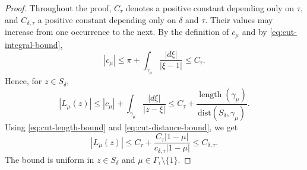 \documentclass[11pt]{amsart}
\numberwithin{equation}{section}
\theoremstyle{definition}
\theoremstyle{plain}
\def\dist{\mathrm{dist}}
\begin{document}
\begin{proof}
Throughout the proof, $C_\tau$ denotes a positive constant depending
only on $\tau$, and $C_{\delta,\tau}$ a positive constant depending
only on $\delta$ and $\tau.$ Their values may increase from one
occurrence to the next.
By the definition of \(c_\mu\) and by \eqref{eq:cut-integral-bound},
\[
        |c_\mu|
        \le
        \pi+
        \int_{\gamma_\mu}\frac{|d\xi|}{|\xi-1|}
        \le C_\tau .
\]
Hence, for \(z\in S_\delta\),
\[
        |L_\mu(z)|
        \le
        |c_\mu|+
        \int_{\gamma_\mu}\frac{|d\xi|}{|z-\xi|}
        \le
        C_\tau+
        \frac{\operatorname{length}(\gamma_\mu)}
             {\dist(S_\delta,\gamma_\mu)} .
\]
Using \eqref{eq:cut-length-bound} and \eqref{eq:cut-distance-bound}, we get
\[
        |L_\mu(z)|
        \le
        C_\tau+
        \frac{C_\tau |1-\mu|}
             {c_{\delta,\tau}|1-\mu|}
        \le C_{\delta,\tau}.
\]
The bound is uniform in \(z\in S_\delta\) and
\(\mu\in\Gamma_\tau\setminus\{1\}\).
\end{proof}
\end{document}
